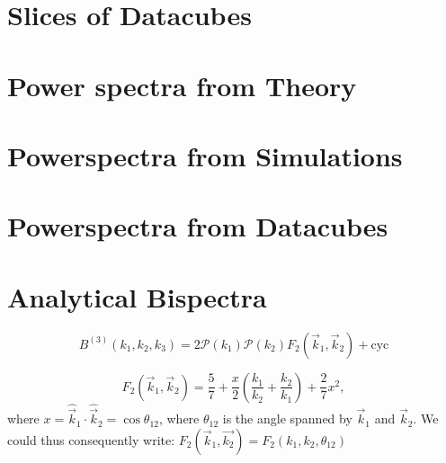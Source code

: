 %
%

\section{Slices of Datacubes}

\section{Power spectra from Theory}


\section{Powerspectra from Simulations}
\begin{figure}
    \centering
  \end{figure}

  \begin{figure}
    \centering
  \end{figure}

\section{Powerspectra from Datacubes}

\section{Analytical Bispectra}

\begin{equation}
  B^{(3)}(k_1,k_2,k_3) = 2\mathcal{P}(k_1)\mathcal{P}(k_2)F_2(\vec{k}_1, \vec{k}_2) + \mathrm{cyc}
\end{equation}

\begin{equation}
  F_2(\vec{k}_1,\vec{k}_2) = \frac{5}{7} + \frac{x}{2}\left(\frac{k_1}{k_2}+\frac{k_2}{k_1}\right) + \frac{2}{7}x^2,
\end{equation}
where $x = \hat{\vec{k}}_1 \cdot \hat{\vec{k}}_2 = \cos{\theta_{12}}$, where $\theta_{12}$ is the angle spanned by $\vec{k}_1$ and $\vec{k}_2$. We could thus consequently write: $F_2(\vec{k}_1,\vec{k_2}) = F_2(k_1,k_2,\theta_{12})$


